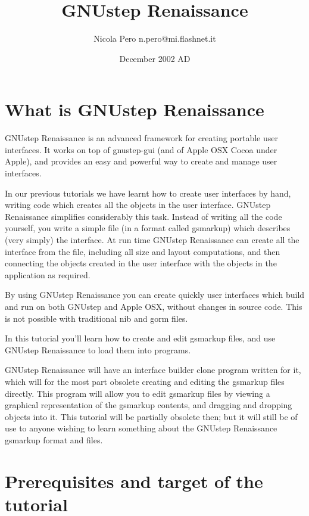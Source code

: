 \documentclass[a4paper]{article}
\begin{document}
\author{Nicola Pero n.pero@mi.flashnet.it}
\title{GNUstep Renaissance}
\date{December 2002 AD}
\maketitle

\section{What is GNUstep Renaissance}

GNUstep Renaissance is an advanced framework for creating portable
user interfaces.  It works on top of gnustep-gui (and of Apple OSX
Cocoa under Apple), and provides an easy and powerful way to create
and manage user interfaces.

In our previous tutorials we have learnt how to create user interfaces
by hand, writing code which creates all the objects in the user
interface.  GNUstep Renaissance simplifies considerably this task.
Instead of writing all the code yourself, you write a simple file (in
a format called gsmarkup) which describes (very simply) the interface.
At run time GNUstep Renaissance can create all the interface from the
file, including all size and layout computations, and then connecting
the objects created in the user interface with the objects in the
application as required.

By using GNUstep Renaissance you can create quickly user interfaces
which build and run on both GNUstep and Apple OSX, without changes in
source code.  This is not possible with traditional nib and gorm
files.

In this tutorial you'll learn how to create and edit gsmarkup files,
and use GNUstep Renaissance to load them into programs.

GNUstep Renaissance will have an interface builder clone program
written for it, which will for the most part obsolete creating and
editing the gsmarkup files directly.  This program will allow you to
edit gsmarkup files by viewing a graphical representation of the
gsmarkup contents, and dragging and dropping objects into it.  This
tutorial will be partially obsolete then; but it will still be of use
to anyone wishing to learn something about the GNUstep Renaissance
gsmarkup format and files.

\section{Prerequisites and target of the tutorial}
\end{document}
